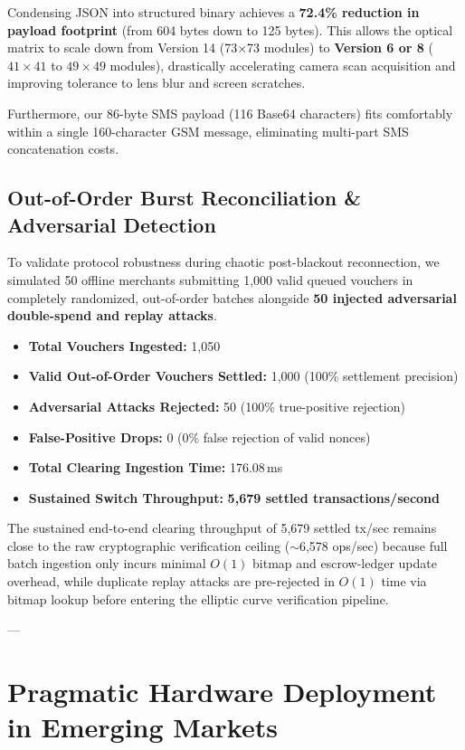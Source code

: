\documentclass[conference]{IEEEtran}
\begin{document}
Condensing JSON into structured binary achieves a \textbf{72.4\% reduction in payload footprint} (from 604 bytes down to 125 bytes). This allows the optical matrix to scale down from Version 14 (73$\times$73 modules) to \textbf{Version 6 or 8} ($41\times41$ to $49\times49$ modules), drastically accelerating camera scan acquisition and improving tolerance to lens blur and screen scratches.

Furthermore, our 86-byte SMS payload (116 Base64 characters) fits comfortably within a single 160-character GSM message, eliminating multi-part SMS concatenation costs.

\subsection{Out-of-Order Burst Reconciliation \& Adversarial Detection}
To validate protocol robustness during chaotic post-blackout reconnection, we simulated 50 offline merchants submitting 1,000 valid queued vouchers in completely randomized, out-of-order batches alongside \textbf{50 injected adversarial double-spend and replay attacks}.

\begin{itemize}
    \item \textbf{Total Vouchers Ingested:} 1,050
    \item \textbf{Valid Out-of-Order Vouchers Settled:} 1,000 (100\% settlement precision)
    \item \textbf{Adversarial Attacks Rejected:} 50 (100\% true-positive rejection)
    \item \textbf{False-Positive Drops:} 0 (0\% false rejection of valid nonces)
    \item \textbf{Total Clearing Ingestion Time:} 176.08\,ms
    \item \textbf{Sustained Switch Throughput:} \textbf{5,679 settled transactions/second}
\end{itemize}

The sustained end-to-end clearing throughput of 5,679 settled tx/sec remains close to the raw cryptographic verification ceiling ($\sim$6,578 ops/sec) because full batch ingestion only incurs minimal $O(1)$ bitmap and escrow-ledger update overhead, while duplicate replay attacks are pre-rejected in $O(1)$ time via bitmap lookup before entering the elliptic curve verification pipeline.

---

\section{Pragmatic Hardware Deployment in Emerging Markets}
\end{document}
